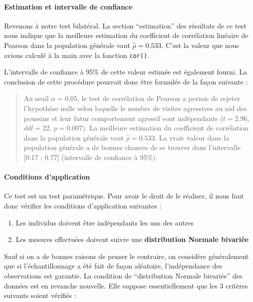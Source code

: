 \documentclass[
  a4paper,
]{article}
\providecommand{\tightlist}{%
  \setlength{\itemsep}{0pt}\setlength{\parskip}{0pt}}
\begin{document}
\hypertarget{estimation-et-intervalle-de-confiance}{%
\paragraph{Estimation et intervalle de confiance}\label{estimation-et-intervalle-de-confiance}}

Revenons à notre test bilatéral. La section ``estimation'' des résultats de ce test nous indique que la meilleure estimation du coefficient de corrélation linéaire de Pearson dans la population générale vaut \(\hat{\rho} = 0.533\). C'est la valeur que nous avions calculé à la main avec la fonction \texttt{cor()}.

L'intervalle de confiance à 95\% de cette valeur estimée est également fourni. La conclusion de cette procédure pourrait donc être formulée de la façon suivante :

\begin{quote}
Au seuil \(\alpha = 0.05\), le test de corrélation de Pearson a permis de rejeter l'hypothèse nulle selon laquelle le nombre de visites agressives au nid des poussins et leur futur comportement agressif sont indépendants (\(t = 2.96\), \(ddl = 22\), \(p = 0.007\)). La meilleure estimation du coefficient de corrélation dans la population générale vaut \(\hat{\rho} = 0.533\). La vraie valeur dans la population générale a de bonnes chances de se trouver dans l'intervalle {[}0.17 ; 0.77{]} (intervalle de confiance à 95\%).
\end{quote}

\hypertarget{conditions-dapplication-3}{%
\paragraph{Conditions d'application}\label{conditions-dapplication-3}}

Ce test est un test paramétrique. Pour avoir le droit de le réaliser, il nous faut donc vérifier les conditions d'application suivantes :

\begin{enumerate}
\def\labelenumi{\arabic{enumi}.}
\tightlist
\item
  Les individus doivent être indépendants les uns des autres
\item
  Les mesures effectuées doivent suivre une \textbf{distribution Normale bivariée}
\end{enumerate}

Sauf si on a de bonnes raisons de penser le contraire, on considère généralement que si l'échantillonnage a été fait de façon aléatoire, l'indépendance des observations est garantie. La condition de ``distribution Normale bivariée'' des données est en revanche nouvelle. Elle suppose essentiellement que les 3 critères suivants soient vérifiés :
\end{document}
